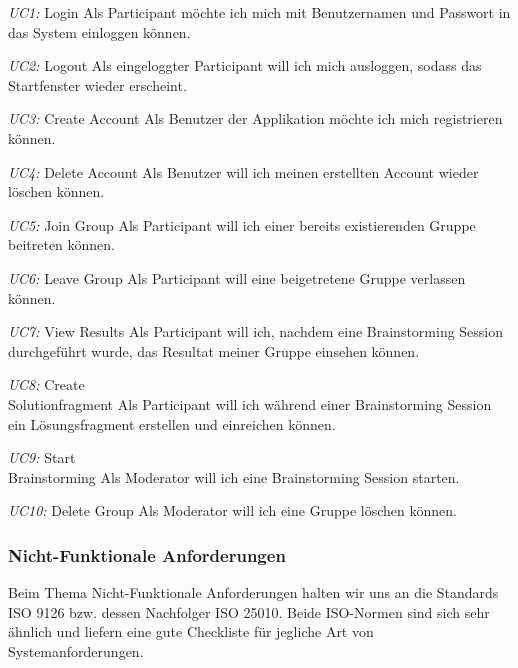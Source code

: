 \begin{basedescript}{%
		\desclabelstyle{\multilinelabel}
		\desclabelwidth{4.5cm}}
	\item[\textit{UC1: }Login] Als Participant möchte ich mich mit Benutzernamen und Passwort in das System einloggen können.
	\item[\textit{UC2: }Logout] Als eingeloggter Participant will ich mich ausloggen, sodass das Startfenster wieder erscheint.
	\item[\textit{UC3: }Create Account] Als Benutzer der Applikation möchte ich mich registrieren können.
	\item[\textit{UC4: }Delete Account] Als Benutzer will ich meinen erstellten Account wieder löschen können.
	\item[\textit{UC5: }Join Group] Als Participant will ich einer bereits existierenden Gruppe beitreten können.
	\item[\textit{UC6: }Leave Group] Als Participant will eine beigetretene Gruppe verlassen können.
	\item[\textit{UC7: }View Results] Als Participant will ich, nachdem eine Brainstorming Session durchgeführt wurde, das Resultat meiner Gruppe einsehen können.
	\item[\textit{UC8: }Create\\Solutionfragment] Als Participant will ich während einer Brainstorming Session ein Lösungsfragment erstellen und einreichen können. 
	\item[\textit{UC9: }Start \\Brainstorming] Als Moderator will ich eine Brainstorming Session starten.
	\item[\textit{UC10: }Delete Group] Als Moderator will ich eine Gruppe löschen können.
\end{basedescript}




\subsubsection{Nicht-Funktionale Anforderungen}
Beim Thema Nicht-Funktionale Anforderungen halten wir uns an die Standards ISO 9126\cite{ISO9126} bzw. dessen Nachfolger ISO 25010\cite{ISO9126_ISO25010}. Beide ISO-Normen sind sich sehr ähnlich und liefern eine gute Checkliste für jegliche Art von Systemanforderungen.

